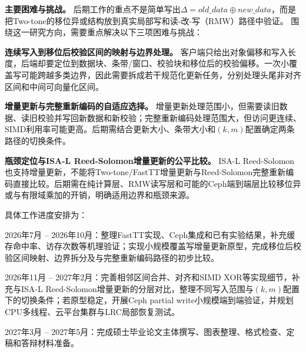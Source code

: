 \textbf{主要困难与挑战。}
后期工作的重点不是简单写出$\Delta=old\_data\oplus new\_data$，而是把Two-tone的移位异或结构放到真实局部写和读-改-写（RMW）路径中验证。
围绕这一研究方向，需要重点解决以下三项困难与挑战：
\begin{closeItemize}
    \item \textbf{连续写入到移位后校验区间的映射与边界处理。} 客户端只给出对象偏移和写入长度，后端却要定位到数据块、条带/窗口、校验块和移位后的校验偏移。一次小覆盖写可能跨越多类边界，因此需要拆成若干规范化更新任务，分别处理头尾非对齐区间和中间可向量化区间。
    \item \textbf{增量更新与完整重新编码的自适应选择。} 增量更新处理范围小，但需要读旧数据、读旧校验并写回新数据和新校验；完整重新编码处理范围大，但访问更连续、SIMD利用率可能更高。后期需结合更新大小、条带大小和$(k,m)$配置确定两条路径的切换条件。
    \item \textbf{瓶颈定位与ISA-L Reed-Solomon增量更新的公平比较。} ISA-L Reed-Solomon也支持增量更新，不能将Two-tone/FastTT增量更新与Reed-Solomon完整重新编码直接比较。后期需在纯计算层、RMW读写层和可能的Ceph端到端层比较移位异或与有限域乘加的开销，明确适用边界和瓶颈来源。
\end{closeItemize}

具体工作进度安排为：
\begin{closeItemize}
    \item 2026年7月 -- 2026年10月：整理FastTT实现、Ceph集成和已有实验结果，补充缓存命中率、访存次数等机理验证；实现小规模覆盖写增量更新原型，完成移位后校验区间映射、边界拆分及与完整重新编码路径的初步比较。
    \item 2026年11月 -- 2027年2月：完善相邻区间合并、对齐和SIMD XOR等实现细节，补充与ISA-L Reed-Solomon增量更新的分层对比，整理不同写入范围与$(k,m)$配置下的切换条件；若原型稳定，开展Ceph partial write小规模端到端验证，并规划CPU多线程、云平台集群与LRC局部恢复测试。
    \item 2027年3月 -- 2027年5月：完成硕士毕业论文主体撰写、图表整理、格式检查、定稿和答辩材料准备。
\end{closeItemize}
